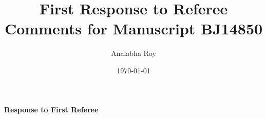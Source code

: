 \documentclass[aps,prb,reprint,showpacs,floatfix,superscriptaddress, onecolumn, nofootinbib, 9pt]{revtex4-2}
\newcommand{\ar}[1]{{\color{blue}#1}} %
\begin{document}

\title{First Response to Referee Comments for Manuscript BJ14850}
\author{Analabha Roy}
\date{\today}

\maketitle



\vspace{1em}

\noindent \textbf{Response to First Referee}
\end{document}
